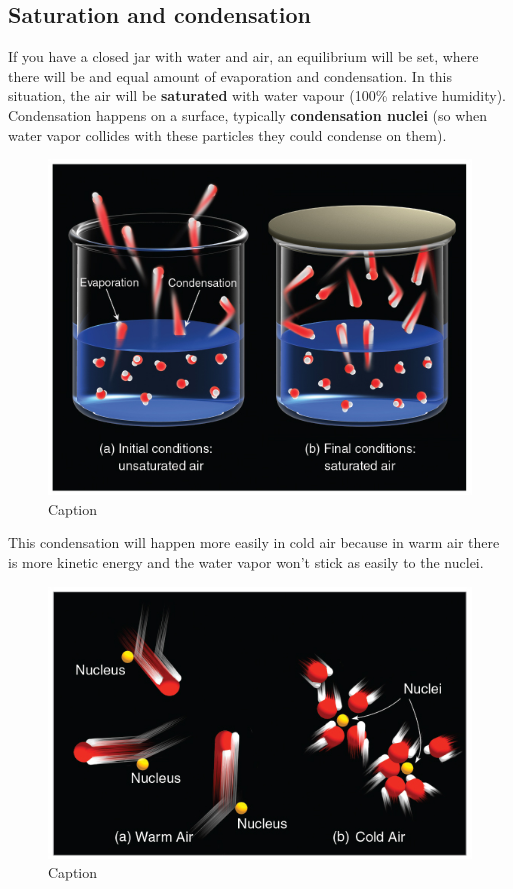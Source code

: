 \documentclass[12pt,oneside]{book}
\begin{document}
\subsection{Saturation and
condensation}\label{saturation-and-condensation}

If you have a closed jar with water and air, an equilibrium will be set,
where there will be and equal amount of evaporation and condensation. In
this situation, the air will be \textbf{saturated} with water vapour
(100\% relative humidity). Condensation happens on a surface, typically
\textbf{condensation nuclei} (so when water vapor collides with these
particles they could condense on them).

\begin{figure}

{\centering \includegraphics[width=0.7\linewidth]{figures/Figure225} 

}

\caption{Caption}\label{fig:Saturation}
\end{figure}

This condensation will happen more easily in cold air because in warm
air there is more kinetic energy and the water vapor won't stick as
easily to the nuclei.

\begin{figure}

{\centering \includegraphics[width=0.7\linewidth]{figures/Figure226} 

}

\caption{Caption}\label{fig:Saturation2}
\end{figure}
\end{document}

